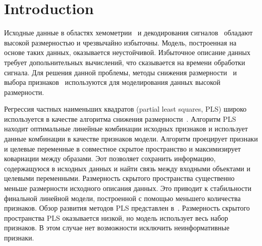 \documentclass[preprint,12pt]{elsarticle}
\theoremstyle{definition}
\begin{document}
\section{Introduction}

Исходные данные в областях хемометрии~\cite{karimi2014leukemia,lin2016equivalence} и декодирования сигналов~\cite{eliseyev2014stable,eliseyev2012l1} обладают высокой размерностью и чрезвычайно избыточны.
Модель, построенная на основе таких данных, оказывается неустойчивой.
Избыточное описание данных требует допольнительных вычислений, что сказывается на времени обработки сигнала.
Для решения данной проблемы, методы снижения размерности~\cite{chun2010sparse,mehmood2012review} и выбора признаков~\cite{katrutsa2015stress,li2017feature} используются для моделирования данных высокой размерности.

Регрессия частных наименьших квадратов (partial least squares, PLS) широко используется в качестве алгоритма снижения размерности~\cite{lauzon2018sequential,engel2017kernel,biancolillo2017extension,hervas2018sparse}. 
Алгоритм PLS находит оптимальные линейные комбинации исходных признаков и использует данные комбинации в качестве признаков модели.
Алгоритм проецирует признаки и целевые переменные в совместное скрытое пространство и максимизирует ковариации между образами.
Эот позволяет сохранить информацию, содержащуюся в исходных данных и найти связь между входными объектами и целевыми переменными.
Размерность скрытого пространства существенно меньше размерности исходного описания данных.
Это приводит к стабильности финальной линейной модели, построенной с помощью меньшего количества признаков.
Обзор развития методов PLS представлен в~\cite{rosipal2006overview,rosipal2011nonlinear}.
Размерность скрытого пространства PLS оказывается низкой, но модель использует весь набор признаков. В этом случае нет возможности исключить неинформативные признаки. 
\end{document}

